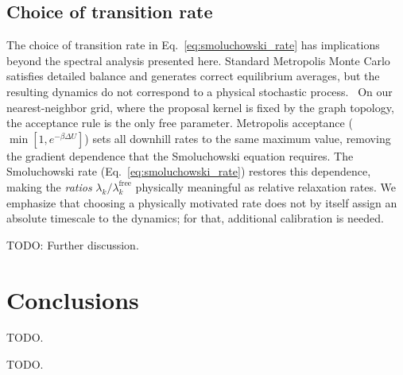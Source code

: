 \documentclass[aps,jcp,reprint,superscriptaddress]{revtex4-2}
\begin{document}
\subsection{Choice of transition rate}

The choice of transition rate in Eq.~\eqref{eq:smoluchowski_rate} has
implications beyond the spectral analysis presented here.
Standard Metropolis Monte Carlo satisfies detailed balance and generates
correct equilibrium averages, but the resulting dynamics do not correspond
to a physical stochastic process.~\cite{huitema1999}
On our nearest-neighbor grid, where the proposal kernel is fixed by the
graph topology, the acceptance rule is the only free parameter.
Metropolis acceptance ($\min[1, e^{-\beta \Delta U}]$) sets all downhill
rates to the same maximum value, removing the gradient dependence that
the Smoluchowski equation requires.
The Smoluchowski rate (Eq.~\ref{eq:smoluchowski_rate}) restores this
dependence, making the \emph{ratios} $\lambda_k / \lambda_k^\mathrm{free}$
physically meaningful as relative relaxation rates.
We emphasize that choosing a physically motivated rate does not by itself
assign an absolute timescale to the dynamics; for that, additional
calibration is needed.~\cite{nowak2000}

TODO: Further discussion.

\section{Conclusions}
\label{sec:conclusions}

TODO.

\begin{acknowledgments}
TODO.
\end{acknowledgments}


\end{document}
